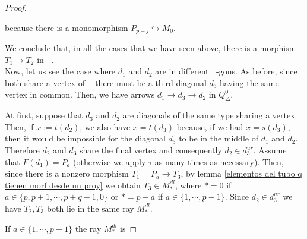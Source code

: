 \documentclass{amsart}
\theoremstyle{plain}
\theoremstyle{definition}
\begin{document}
\begin{proof}
\begin{itemize}
because there is a monomorphism  $P_{p+j}\hookrightarrow M_0$.

\end{itemize}

We conclude that, in all the cases that we have seen above, there is a  morphism $T_1\rightarrow T_2$ in ${\mathop{\mathcal{C}_m}\nolimits}$.\\
Now, let us see the case where  $d_1$ and  $d_2$ are in different ${\mathop{(m+2)}\nolimits}$-gons. As before, since both share a vertex of ${\mathop{P_{p,q,m}}\nolimits}$ there must be a third diagonal $d_3$ having the same vertex in common. Then, we have arrows $d_1\rightarrow d_3 \rightarrow d_2$ in  $Q_{\Delta}^0$.

At first, suppose that  $d_3$ and  $d_2$ are  diagonals of the same type sharing a vertex. Then, if   $x:=t(d_2)$, we also  have  $x=t(d_3)$ because, if we had  $x=s(d_3)$, then it would be  impossible for the diagonal $d_3$ to be in the middle of $d_1$ and $d_2$. Therefore  $d_2$ and $d_3$ share the   final vertex and consequently  $d_2\in d_3^{ur}$. Assume that $F(d_1)=P_a$ (otherwise we apply  $\tau$ as many times as necessary). Then, since there is a nonzero morphism $T_1=P_a \rightarrow T_3$, by lemma \ref{elementos del tubo q tienen morf desde un proy} we obtain $T_3\in
M_*^{dl}$, where $*= 0$ if $a\in \{p, p+1, \cdots, p+q-1, 0\}$ or $*=
p-a$ if $a\in \{1, \cdots, p-1\}$. Since $d_2\in d_3^{ur}$
we have $T_2, T_3 $ both lie in the same ray $M_*^{dl}$.

If $a\in \{1, \cdots, p-1\}$ the ray  $M_*^{dl}$ is


\end{proof}
\end{document}
